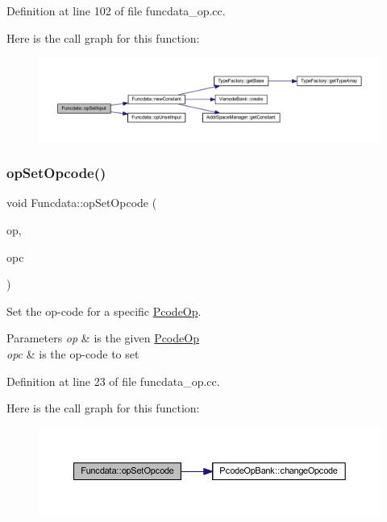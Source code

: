 Definition at line 102 of file funcdata\+\_\+op.\+cc.

Here is the call graph for this function\+:
\nopagebreak
\begin{figure}[H]
\begin{center}
\leavevmode
\includegraphics[width=350pt]{class_funcdata_aa079e2bd26e92671be79601535236a63_cgraph}
\end{center}
\end{figure}
\mbox{\label{class_funcdata_ad9dbf52668db4a1923537e2128719181}} 
\subsubsection{\texorpdfstring{opSetOpcode()}{opSetOpcode()}}
{\footnotesize\ttfamily void Funcdata\+::op\+Set\+Opcode (\begin{DoxyParamCaption}\item[{\mbox{\hyperlink{class_pcode_op}{Pcode\+Op}} $\ast$}]{op,  }\item[{\mbox{\hyperlink{opcodes_8hh_abeb7dfb0e9e2b3114e240a405d046ea7}{Op\+Code}}}]{opc }\end{DoxyParamCaption})}



Set the op-\/code for a specific \mbox{\hyperlink{class_pcode_op}{Pcode\+Op}}. 


\begin{DoxyParams}{Parameters}
{\em op} & is the given \mbox{\hyperlink{class_pcode_op}{Pcode\+Op}} \\
\hline
{\em opc} & is the op-\/code to set \\
\hline
\end{DoxyParams}


Definition at line 23 of file funcdata\+\_\+op.\+cc.

Here is the call graph for this function\+:
\nopagebreak
\begin{figure}[H]
\begin{center}
\leavevmode
\includegraphics[width=350pt]{class_funcdata_ad9dbf52668db4a1923537e2128719181_cgraph}
\end{center}
\end{figure}
\mbox{\label{class_funcdata_ab2bd3523c574c5b303728ef4d880ec3a}} 

